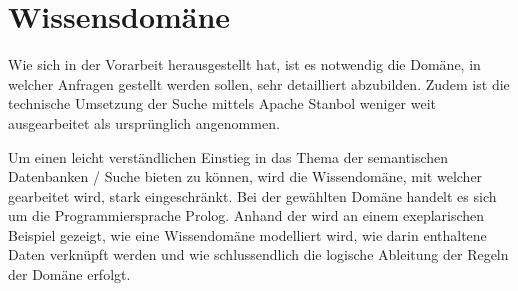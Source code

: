 \chapter{Wissensdomäne}
\label{chap:wissensdomäne}
Wie sich in der Vorarbeit herausgestellt hat, ist es notwendig die Domäne, in welcher Anfragen gestellt werden sollen, sehr detailliert abzubilden. Zudem ist die technische Umsetzung der Suche mittels Apache Stanbol weniger weit ausgearbeitet als ursprünglich angenommen.

Um einen leicht verständlichen Einstieg in das Thema der semantischen Datenbanken / Suche bieten zu können, wird die Wissendomäne, mit welcher gearbeitet wird, stark eingeschränkt. Bei der gewählten Domäne handelt es sich um die Programmiersprache Prolog. Anhand der wird an einem exeplarischen Beispiel gezeigt, wie eine Wissendomäne modelliert wird, wie darin enthaltene Daten verknüpft werden und wie schlussendlich die logische Ableitung der Regeln der Domäne erfolgt.



